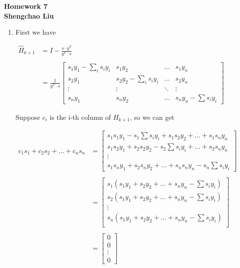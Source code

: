 \documentclass[12pt]{article}
\begin{document}
\begin{center} {\Large
{\bf Homework 7\\Shengchao Liu}}
\end{center}

\begin{enumerate}

\item

First we have

$\begin{array}{lll}
\hat H_{k+1} &= I - \frac{s \cdot y^T}{y^T \cdot s}\\
\\
& = \frac{1}{y^T \cdot s}
    \begin{bmatrix} s_1 y_1 - \sum_i s_i y_i & s_1 y_2 & \hdots & s_1 y_n \\
                    s_2 y_1 & s_2 y_2 - \sum_i s_i y_i & \hdots & s_2 y_n \\
                    \vdots & \vdots & \ddots & \vdots\\
                    s_n y_1 & s_n y_2 & \hdots & s_n y_n - \sum s_i y_i\end{bmatrix}
\end{array}$

Suppose $c_i$ is the i-th column of $\hat H_{k+1}$, so we can get

$\begin{array}{lll}
c_1 s_1 + c_2 s_2 + \hdots + c_n s_n & =
\begin{bmatrix}s_1 s_1 y_1 - s_1 \sum s_i y_i + s_1 s_2 y_2 + \hdots + s_1 s_n y_n\\
               s_1 s_2 y_1 + s_2 s_2 y_2 - s_2 \sum s_i y_i + \hdots + s_2 s_n y_n\\
               \vdots\\
               s_1 s_n y_1 + s_2 s_n y_2 + \hdots + s_n s_n y_n - s_n \sum s_i y_i\end{bmatrix}\\
\\
& =
\begin{bmatrix}s_1 (s_1 y_1 + s_2 y_2 + \hdots + s_n y_n - \sum s_i y_i)\\
               s_2 (s_1 y_1 + s_2 y_2 + \hdots + s_n y_n - \sum s_i y_i)\\
               \vdots\\
               s_n (s_1 y_1 + s_2 y_2 + \hdots + s_n y_n - \sum s_i y_i)\\\end{bmatrix}\\
\\
& = \begin{bmatrix}0 \\ 0 \\ \vdots \\ 0\end{bmatrix}
\end{array}$


\end{enumerate}
\end{document}
